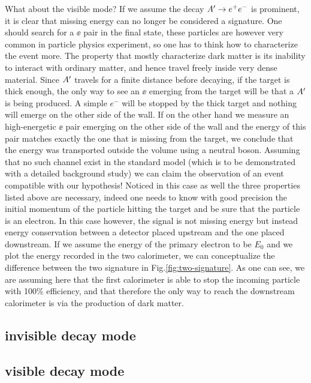 What about the visible mode? If we assume the decay $A' \to e^+e^-$ is prominent, it is clear that missing energy can no longer be considered a signature. One should search for a $\ee$ pair in the final state, these particles are however very common in particle physics experiment, so one has to think how to characterize the event more. The property that mostly characterize dark matter is its inability to interact with ordinary matter, and hence travel freely inside very dense material. Since $A'$ travels for a finite distance before decaying, if the target is thick enough, the only way to see an $\ee$ emerging from the target will be that a $A'$ is being produced. A simple $e^-$ will be stopped by the thick target and nothing will emerge on the other side of the wall. If on the other hand we measure an high-energetic $\ee$ pair emerging on the other side of the wall and the energy of this pair matches exactly the one that is missing from the target, we conclude that the energy was transported outside the volume using a neutral boson. Assuming that no such channel exist in the standard model (which is to be demonstrated with a detailed background study) we can claim the observation of an event compatible with our hypothesis! Noticed in this case as well the three properties listed above are necessary, indeed one needs to know with good precision the initial momentum of the particle hitting the target and be sure that the particle is an electron. In this case however, the signal is not missing energy but instead energy conservation between a detector placed upstream and the one placed downstream. If we assume the energy of the primary electron to be $E_0$ and we plot the energy recorded in the two calorimeter, we can conceptualize the difference between the two signature in Fig.\ref{fig:two-signature}. As one can see, we are assuming here that the first calorimeter is able to stop the incoming particle with 100\% efficiency, and that therefore the only way to reach the downstream calorimeter is via the production of dark matter.

\subsection{invisible decay mode}
\label{chapter2:sec:experimental-technique-invis}

\subsection{visible decay mode}
\label{chapter2:sec:experimental-technique-vis}

